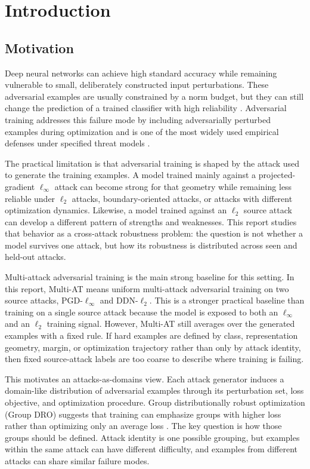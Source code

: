 \chapter{Introduction}
\label{chap:introduction}

\section{Motivation}

Deep neural networks can achieve high standard accuracy while remaining
vulnerable to small, deliberately constructed input perturbations.  These
adversarial examples are usually constrained by a norm budget, but they can
still change the prediction of a trained classifier with high reliability
\cite{szegedy2014intriguing,goodfellow2015explaining}.  Adversarial training
addresses this failure mode by including adversarially perturbed examples during
optimization and is one of the most widely used empirical defenses under
specified threat models \cite{madry2019towards}.

The practical limitation is that adversarial training is shaped by the attack
used to generate the training examples.  A model trained mainly against a
projected-gradient \(\ell_\infty\) attack can become strong for that geometry
while remaining less reliable under \(\ell_2\) attacks, boundary-oriented
attacks, or attacks with different optimization dynamics.  Likewise, a model
trained against an \(\ell_2\) source attack can develop a different pattern of
strengths and weaknesses.  This report studies that behavior as a
cross-attack robustness problem: the question is not whether a model survives
one attack, but how its robustness is distributed across seen and held-out
attacks.

Multi-attack adversarial training is the main strong baseline for this setting.
In this report, Multi-AT means uniform multi-attack adversarial training on two
source attacks, PGD-\(\ell_\infty\) and DDN-\(\ell_2\).  This is a stronger
practical baseline than training on a single source attack because the model is
exposed to both an \(\ell_\infty\) and an \(\ell_2\) training signal.  However,
Multi-AT still averages over the generated examples with a fixed rule.  If hard
examples are defined by class, representation geometry, margin, or optimization
trajectory rather than only by attack identity, then fixed source-attack labels
are too coarse to describe where training is failing.

This motivates an attacks-as-domains view.  Each attack generator induces a
domain-like distribution of adversarial examples through its perturbation set,
loss objective, and optimization procedure.  Group distributionally robust
optimization (Group DRO) suggests that training can emphasize groups with higher
loss rather than optimizing only an average loss \cite{sagawa2019groupdro}.  The
key question is how those groups should be defined.  Attack identity is one
possible grouping, but examples within the same attack can have different
difficulty, and examples from different attacks can share similar failure modes.

